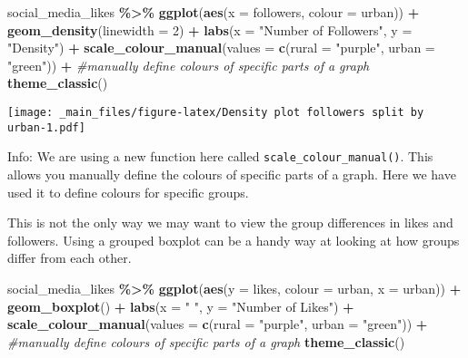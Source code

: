 \documentclass[
]{book}
\newenvironment{Shaded}{\begin{snugshade}}{\end{snugshade}}
\newcommand{\AttributeTok}[1]{\textcolor[rgb]{0.13,0.29,0.53}{#1}}
\newcommand{\CommentTok}[1]{\textcolor[rgb]{0.56,0.35,0.01}{\textit{#1}}}
\newcommand{\DecValTok}[1]{\textcolor[rgb]{0.00,0.00,0.81}{#1}}
\newcommand{\FunctionTok}[1]{\textcolor[rgb]{0.13,0.29,0.53}{\textbf{#1}}}
\newcommand{\NormalTok}[1]{#1}
\newcommand{\SpecialCharTok}[1]{\textcolor[rgb]{0.81,0.36,0.00}{\textbf{#1}}}
\newcommand{\StringTok}[1]{\textcolor[rgb]{0.31,0.60,0.02}{#1}}
\begin{document}
\begin{Shaded}
\begin{Highlighting}[]
\NormalTok{social\_media\_likes }\SpecialCharTok{\%\textgreater{}\%} 
  \FunctionTok{ggplot}\NormalTok{(}\FunctionTok{aes}\NormalTok{(}\AttributeTok{x =}\NormalTok{ followers, }\AttributeTok{colour =}\NormalTok{ urban)) }\SpecialCharTok{+}
  \FunctionTok{geom\_density}\NormalTok{(}\AttributeTok{linewidth =} \DecValTok{2}\NormalTok{) }\SpecialCharTok{+}
  \FunctionTok{labs}\NormalTok{(}\AttributeTok{x =} \StringTok{"Number of Followers"}\NormalTok{, }\AttributeTok{y =} \StringTok{"Density"}\NormalTok{) }\SpecialCharTok{+}
  \FunctionTok{scale\_colour\_manual}\NormalTok{(}\AttributeTok{values =} \FunctionTok{c}\NormalTok{(}\AttributeTok{rural =} \StringTok{"purple"}\NormalTok{, }\AttributeTok{urban =} \StringTok{"green"}\NormalTok{)) }\SpecialCharTok{+} \CommentTok{\#manually define colours of specific parts of a graph}
  \FunctionTok{theme\_classic}\NormalTok{() }
\end{Highlighting}
\end{Shaded}

\texttt{[image: \_main\_files/figure-latex/Density plot followers split by urban-1.pdf]}

Info: We are using a new function here called \texttt{scale\_colour\_manual()}. This allows you manually define the colours of specific parts of a graph. Here we have used it to define colours for specific groups.

This is not the only way we may want to view the group differences in likes and followers. Using a grouped boxplot can be a handy way at looking at how groups differ from each other.

\begin{Shaded}
\begin{Highlighting}[]
\NormalTok{social\_media\_likes }\SpecialCharTok{\%\textgreater{}\%} 
  \FunctionTok{ggplot}\NormalTok{(}\FunctionTok{aes}\NormalTok{(}\AttributeTok{y =}\NormalTok{ likes, }\AttributeTok{colour =}\NormalTok{ urban, }\AttributeTok{x =}\NormalTok{ urban)) }\SpecialCharTok{+}
  \FunctionTok{geom\_boxplot}\NormalTok{() }\SpecialCharTok{+}
  \FunctionTok{labs}\NormalTok{(}\AttributeTok{x =} \StringTok{" "}\NormalTok{, }\AttributeTok{y =} \StringTok{"Number of Likes"}\NormalTok{) }\SpecialCharTok{+}
  \FunctionTok{scale\_colour\_manual}\NormalTok{(}\AttributeTok{values =} \FunctionTok{c}\NormalTok{(}\AttributeTok{rural =} \StringTok{"purple"}\NormalTok{, }\AttributeTok{urban =} \StringTok{"green"}\NormalTok{)) }\SpecialCharTok{+} \CommentTok{\#manually define colours of specific parts of a graph}
  \FunctionTok{theme\_classic}\NormalTok{() }
\end{Highlighting}
\end{Shaded}
\end{document}
